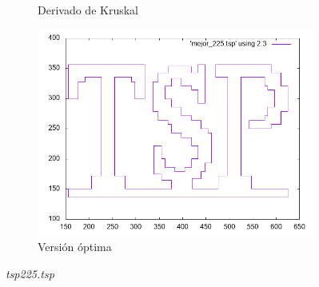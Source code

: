 \documentclass[12pt,spanish]{article}
\begin{document}
\begin{figure}[H]
\begin{subfigure}[b]{0.36\textwidth}
\caption{Derivado de Kruskal}
\end{subfigure}
\quad
\begin{subfigure}[b]{0.36\textwidth}
\includegraphics[width=\textwidth]{tsp225_mejor.png}
\caption{Versión óptima}
\end{subfigure}
\caption{\textit{tsp225.tsp}}
\end{figure}
\end{document}
